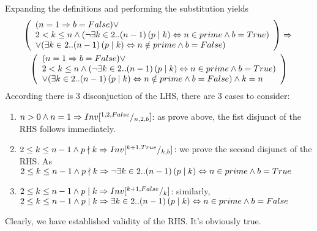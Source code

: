 \documentclass[headings=small,a4paper,12pt]{scrartcl}
\begin{document}
Expanding the definitions and performing the substitution yields
\begin{gather*}
	\left(
  \begin{array}{l}
 (n = 1 \Rightarrow b = False ) \vee\\
2< k \leq n \wedge (\neg\exists k \in 2..(n-1)\left( p \mid k\right)\Leftrightarrow n \in prime\wedge b = True)\\
\vee (\exists k \in 2..(n-1)\left(p \mid k\right)\Leftrightarrow n \notin prime\wedge b = False)\\
  \end{array}
	\right)
  \Rightarrow{}\\
  \left(
\begin{array}{l}
 (n = 1 \Rightarrow b = False ) \vee\\
2< k \leq n \wedge (\neg\exists k \in 2..(n-1)\left( p \mid k\right)\Leftrightarrow n \in prime\wedge b = True)\\
\vee (\exists k \in 2..(n-1)\left(p \mid k\right)\Leftrightarrow n \notin prime\wedge b = False) \wedge k = n
\end{array}
\right)
\end{gather*}
According there is 3 disconjuction of the LHS, there are 3 cases to consider:
\begin{enumerate}
	\item $n>0 \wedge n = 1 \Rightarrow Inv[^{1,2,False}/_{n,2,b}] $: as prove above, the fist disjunct of the RHS follows immediately.
  \item $2\leq k \leq n-1 \wedge p \nmid k \Rightarrow Inv [^{k+1, True}/_{k,b}]$: we prove the second disjunct of the RHS. As $2\leq k \leq n-1 \wedge p \nmid k \Rightarrow \neg\exists k \in 2..(n-1)\left( p \mid k\right)\Leftrightarrow n \in prime\wedge b = True$
  \item $2\leq k \leq n-1 \wedge p \mid k \Rightarrow Inv [^{k+1, False}/_{k}]$: similarly, $2\leq k \leq n-1 \wedge p \mid k \Rightarrow \exists k \in 2..(n-1)\left( p \mid k\right)\Leftrightarrow n \in prime\wedge b = False$
\end{enumerate}
Clearly, we have established validity of the RHS. It's obviously true.\\
\end{document}
